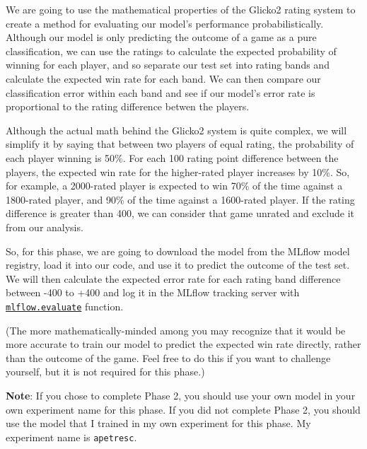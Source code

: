 \documentclass{article}
\begin{document}
We are going to use the mathematical properties of the Glicko2 rating system to create a
method for evaluating our model's performance probabilistically. Although our model is only
predicting the outcome of a game as a pure classification, we can use the ratings
to calculate the expected probability of winning for each player, and so separate our test
set into rating bands and calculate the expected win rate for each band. We can then compare
our classification error within each band and see if our model's error rate is proportional
to the rating difference betwen the players.

Although the actual math behind the Glicko2 system is quite complex, we will simplify it by saying
that between two players of equal rating, the probability of each player winning is 50\%. For each
100 rating point difference between the players, the expected win rate for the higher-rated player
increases by 10\%. So, for example, a 2000-rated player is expected to win 70\% of the time against
a 1800-rated player, and 90\% of the time against a 1600-rated player. If the rating difference is
greater than 400, we can consider that game unrated and exclude it from our analysis.

So, for this phase, we are going to download the model from the MLflow model registry, load it into
our code, and use it to predict the outcome of the test set. We will then calculate the expected error rate for each rating band difference between -400 to +400 and log it in the MLflow tracking server with \texttt{\href{https://mlflow.org/docs/latest/python\_api/mlflow.html\#mlflow.evaluate}{mlflow.evaluate}} function.

(The more mathematically-minded among you may recognize that it would be more accurate to train
our model to predict the expected win rate directly, rather than the outcome of the game.
Feel free to do this if you want to challenge yourself, but it is not required for this phase.)

\textbf{Note}: If you chose to complete Phase 2, you should use your own model in your own
experiment name for this phase. If you did not complete Phase 2, you should use the model
that I trained in my own experiment for this phase. My experiment name is \texttt{apetresc}.
\end{document}
